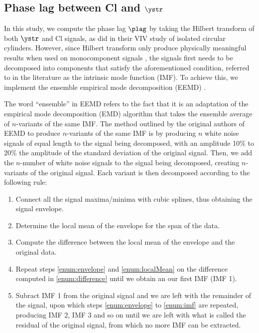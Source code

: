 \documentclass[a4paper,fleqn]{cas-sc}
\begin{document}
\subsection{Phase lag between Cl and $\ystr$} \label{ssec:phaseLag90}

In this study, we compute the phase lag $\plag$ by taking the Hilbert transform of both $\ystr$ and Cl signals, as \citet{Khalak1999} did in their VIV study of isolated circular cylinders. However, since Hilbert transform only produce physically meaningful results when used on monocomponent signals \citep{Huang1998,Huang2005,Huang2014}, the signals first needs to be decomposed into components that satisfy the aforementioned condition, referred to in the literature as the intrinsic mode function (IMF). To achieve this, we implement the ensemble empirical mode decomposition (EEMD) \citep{Wu2008}.

The word ``ensemble'' in EEMD refers to the fact that it is an adaptation of the empirical mode decomposition (EMD) algorithm that takes the ensemble average of $n$-variants of the same IMF. The method outlined by the original authors of EEMD \citep{Wu2008} to produce $n$-variants of the same IMF is by producing $n$ white noise signals of equal length to the signal being decomposed, with an amplitude 10\% to 20\% the amplitude of the standard deviation of the original signal. Then, we add the $n$-number of white noise signals to the signal being decomposed, creating $n$-variants of the original signal. Each variant is then decomposed according to the following rule:

\begin{enumerate} \label{enumerate:emd}
  \item Connect all the signal maxima/minima with cubic splines, thus obtaining the signal envelope. \label{enum:envelope}
  \item Determine the local mean of the envelope for the span of the data. \label{enum:localMean}
  \item Compute the difference between the local mean of the envelope and the original data. \label{enum:difference}
  \item Repeat steps \ref{enum:envelope} and \ref{enum:localMean} on the difference computed in \ref{enum:difference} until we obtain an our first IMF (IMF 1). \label{enum:imf}
  \item Subract IMF 1 from the original signal and we are left with the remainder of the signal, upon which steps \ref{enum:envelope} to \ref{enum:imf} are repeated, producing IMF 2, IMF 3 and so on until we are left with what is called the residual of the original signal, from which no more IMF can be extracted.

\end{enumerate}
\end{document}
